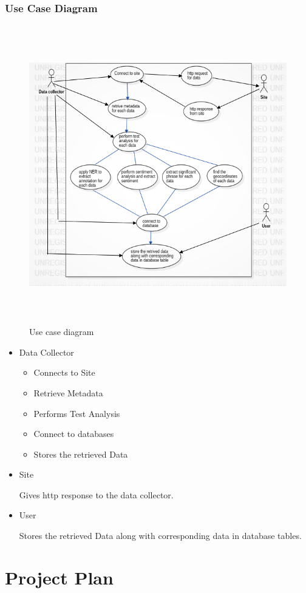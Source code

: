 \documentclass[oneside,a4paper,12pt]{book}
\begin{document}
\subsection{Use Case Diagram}
\begin{figure}[h!]
  \centering
  \includegraphics[width=15cm,
  height=13cm]{usecase.png}
  \caption{Use case diagram}
\end{figure}
\begin{itemize}
    \item Data Collector
    \begin{itemize}
        \item Connects to Site
        \item Retrieve Metadata
        \item Performs Test Analysis
        \item Connect to databases
        \item Stores the retrieved Data
    \end{itemize}
    \item Site
    \par Gives http response to the data collector.
    \item User
    \par Stores the retrieved Data along with corresponding data in database tables.
\end{itemize}
\chapter{Project Plan}
\end{document}
